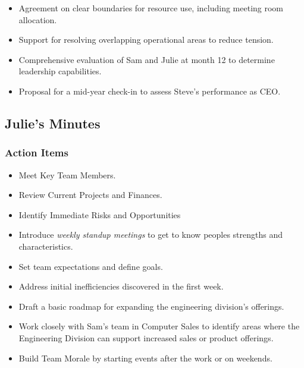 \documentclass[a4paper,12pt]{article}
\begin{document}
\begin{itemize}
    \item Agreement on clear boundaries for resource use, including meeting room allocation.
    \item Support for resolving overlapping operational areas to reduce tension.
\end{itemize}

\begin{itemize}
    \item Comprehensive evaluation of Sam and Julie at month 12 to determine leadership capabilities.
    \item Proposal for a mid-year check-in to assess Steve’s performance as CEO.
\end{itemize}

\subsection{Julie's Minutes}
\author{Phileas Barome (John)}

\subsubsection{Action Items}

\begin{itemize}
    \item Meet Key Team Members.
    \item Review Current Projects and Finances.
    \item Identify Immediate Risks and Opportunities
\end{itemize}

\begin{itemize}
    \item Introduce \textit{weekly standup meetings} to get to know peoples strengths and characteristics.
    \item Set team expectations and define goals.
\end{itemize}

\begin{itemize}
    \item Address initial inefficiencies discovered in the first week.
    \item Draft a basic roadmap for expanding the engineering division’s offerings.
    \item Work closely with Sam’s team in Computer Sales to identify areas where the Engineering Division can support increased sales or product offerings.
    \item Build Team Morale by starting events after the work or on weekends.

\end{itemize}
\end{document}
